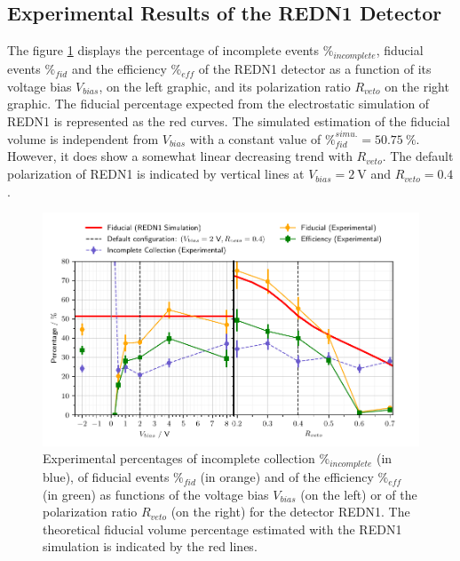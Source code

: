 \subsection{Experimental Results of the REDN1 Detector}
\label{par:redn1-comparison}

The figure \ref{fig:redn1-experimental-fiducial-volume} displays the percentage of incomplete events $\%_{incomplete}$, fiducial events $\%_{fid}$ and the efficiency $\%_{eff}$ of the REDN1 detector as a function of its voltage bias $V_{bias}$, on the left graphic, and its polarization ratio $R_{veto}$ on the right graphic. The fiducial percentage expected from the electrostatic simulation of REDN1 is represented as the red curves. The simulated estimation of the fiducial volume is independent from $V_{bias}$ with a constant value of $\%_{fid}^{simu.}=\SI{50.75}{\percent}$. However, it does show a somewhat linear decreasing trend with $R_{veto}$. The default polarization of REDN1 is indicated by vertical lines at $V_{bias}=\SI{2}{\volt}$ and $R_{veto}=0.4$.

\begin{figure}
\centering
\includegraphics[scale=1]{Figures/ElectrodesExperimental/redn1_experimental_fiducial_volume.pdf}
\caption{Experimental percentages of incomplete collection $\%_{incomplete}$ (in blue), of fiducial events $\%_{fid}$ (in orange) and of the efficiency $\%_{eff}$ (in green) as functions of the voltage bias $V_{bias}$ (on the left) or of the polarization ratio $R_{veto}$ (on the right) for the detector REDN1. The theoretical fiducial volume percentage estimated with the REDN1 simulation is indicated by the red lines.}
\label{fig:redn1-experimental-fiducial-volume}
\end{figure}


